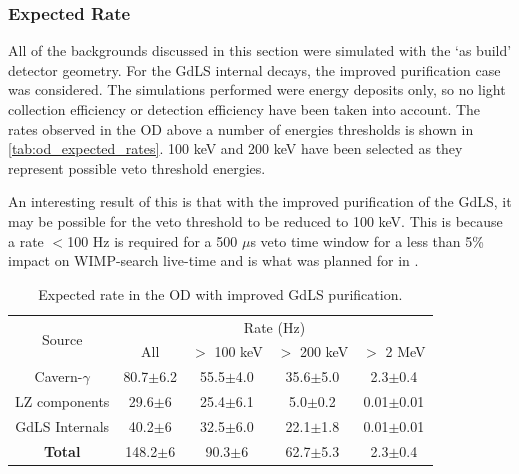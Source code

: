 \subsubsection{Expected Rate}
\par
All of the backgrounds discussed in this section were simulated with the `as build' detector geometry.
For the GdLS internal decays, the improved purification case was considered.
The simulations performed were energy deposits only, so no light collection efficiency or detection efficiency have been taken into account.
The rates observed in the OD above a number of energies thresholds is shown in \autoref{tab:od_expected_rates}.
100 keV and 200 keV have been selected as they represent possible veto threshold energies.


\par
An interesting result of this is that with the improved purification of the GdLS, it may be possible for the veto threshold to be reduced to 100 keV.
This is because a rate $<$100 Hz is required for a 500 $\mu$s veto time window for a less than 5\% impact on WIMP-search live-time and is what was planned for in \cite{LZ_TechnicalDesignReview_ref}.

\begin{table}[]
    \centering
    \begin{tabular}{c|c|c|c|c} %
    \hline
    \multirow{2}{*}{Source} & \multicolumn{4}{c}{Rate (Hz)} \\
                            & All          & $>$ 100 keV   & $>$ 200 keV   & $>$ 2 MeV \\ \hline
    Cavern-$\gamma$         & 80.7$\pm$6.2 & 55.5$\pm$4.0  & 35.6$\pm$5.0  & 2.3$\pm$0.4     \\
    LZ components           & 29.6$\pm$6   & 25.4$\pm$6.1  & 5.0$\pm$0.2   & 0.01$\pm$0.01   \\
    GdLS Internals          & 40.2$\pm$6   & 32.5$\pm$6.0  & 22.1$\pm$1.8  & 0.01$\pm$0.01   \\ \hline
    \textbf{Total}          & 148.2$\pm$6  & 90.3$\pm$6    & 62.7$\pm$5.3  & 2.3$\pm$0.4      \\ \hline
    \end{tabular}
    \caption{Expected rate in the OD with improved GdLS purification.}
    \label{tab:od_expected_rates}
\end{table} 





